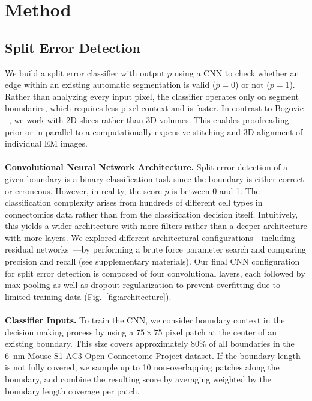

\section{Method}
\label{sec:methods}

\subsection{Split Error Detection}

We build a split error classifier with output $p$ using a CNN to check whether an edge within an existing automatic segmentation is valid ($p=0$) or not ($p=1$). Rather than analyzing every input pixel, the classifier operates only on segment boundaries, which requires less pixel context and is faster. In contrast to Bogovic \etal~\cite{BogovicHJ13}, we work with 2D slices rather than 3D volumes. This enables proofreading prior or in parallel to a computationally expensive stitching and 3D alignment of individual EM images.
\\~\\
\textbf{Convolutional Neural Network Architecture.} Split error detection of a given boundary is a binary classification task since the boundary is either correct or erroneous. However, in reality, the score $p$ is between 0 and 1. The classification complexity arises from hundreds of different cell types in connectomics data rather than from the classification decision itself. Intuitively, this yields a wider architecture with more filters rather than a deeper architecture with more layers. We explored different architectural configurations---including residual networks~\cite{resnet}---by performing a brute force parameter search and comparing precision and recall (see supplementary materials). Our final CNN configuration for split error detection is composed of four convolutional layers, each followed by max pooling as well as dropout regularization to prevent overfitting due to limited training data (Fig.~\ref{fig:architecture}).
\\~\\
\textbf{Classifier Inputs.} To train the CNN, we consider boundary context in the decision making process by using a $75\times75$ pixel patch at the center of an existing boundary. This size covers approximately $80\%$ of all boundaries in the 6~nm Mouse S1 AC3 Open Connectome Project dataset. If the boundary length is not fully covered, we sample up to 10 non-overlapping patches along the boundary, and combine the resulting score by averaging weighted by the boundary length coverage per patch.

